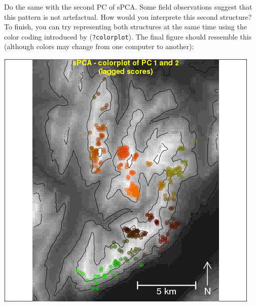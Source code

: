 \documentclass{article}
\begin{document}
Do the same with the second PC of sPCA.
Some field observations suggest that this pattern is not artefactual.
How would you interprete this second structure?
\\

To finish, you can try representing both structures at the same time
using the color coding introduced by \cite{tj177} (\texttt{?colorplot}).
The final figure should ressemble this (although colors may change from one computer to another):
\begin{Schunk}
\end{Schunk}

\begin{center}
\includegraphics[width=.6\textwidth]{figs/rupicacolors.png}
\end{center}
\end{document}

